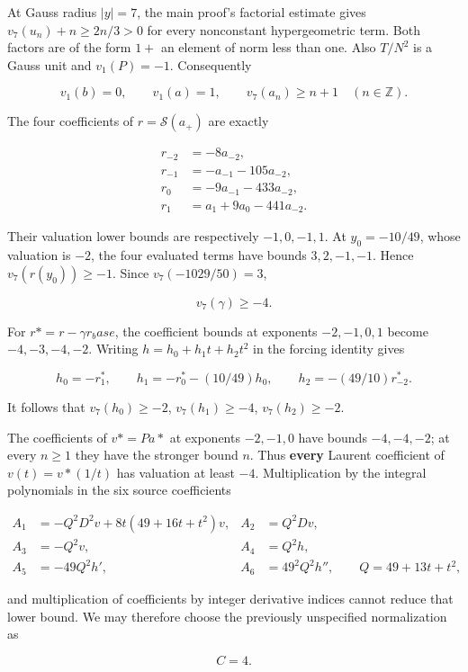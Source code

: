 \documentclass[11pt,a4paper]{article}
\begin{document}
At Gauss radius \(|y|=7\), the main proof's factorial estimate gives \(v_{7}(u_n)+n≥2n/3>0\) for every nonconstant hypergeometric term. Both factors are of the form \(1+\) an element of norm less than one. Also \(T/N^{2}\) is a Gauss unit and \(v_{1}(P)=-1\). Consequently

\[
v_1(b)=0,\qquad v_1(a)=1,\qquad v_7(a_n)\ge n+1\quad(n\in\mathbb Z).
\]

The four coefficients of \(r=\mathcal{S}(a_{+})\) are exactly

\[
\begin{aligned}
r_{-2}&=-8a_{-2},\\
r_{-1}&=-a_{-1}-105a_{-2},\\
r_0&=-9a_{-1}-433a_{-2},\\
r_1&=a_1+9a_0-441a_{-2}.
\end{aligned}
\]

Their valuation lower bounds are respectively \(-1,0,-1,1\). At \(y_{0}=-10/49\), whose valuation is \(-2\), the four evaluated terms have bounds \(3,2,-1,-1\). Hence \(v_{7}(r(y_{0}))≥-1\). Since \(v_{7}(-1029/50)=3\),

\[
v_7(\gamma)\ge-4.
\]

For \(r*=r-γr_base\), the coefficient bounds at exponents \(-2,-1,0,1\) become \(-4,-3,-4,-2\). Writing \(h=h_{0}+h_{1}t+h_{2}t^{2}\) in the forcing identity gives

\[
h_0=-r^*_1,\qquad
h_1=-r^*_0-(10/49)h_0,\qquad
h_2=-(49/10)r^*_{-2}.
\]

It follows that \(v_{7}(h_{0})≥-2\), \(v_{7}(h_{1})≥-4\), \(v_{7}(h_{2})≥-2\).

The coefficients of \(v*=Pa*\) at exponents \(-2,-1,0\) have bounds \(-4,-4,-2\); at every \(n≥1\) they have the stronger bound \(n\). Thus \textbf{every} Laurent coefficient of \(v(t)=v*(1/t)\) has valuation at least \(-4\). Multiplication by the integral polynomials in the six source coefficients

\[
\begin{aligned}
A_1&=-Q^2D^2v+8t(49+16t+t^2)v,&A_2&=Q^2Dv,\\
A_3&=-Q^2v,&A_4&=Q^2h,\\
A_5&=-49Q^2h',&A_6&=49^2Q^2h'',\qquad Q=49+13t+t^2,
\end{aligned}
\]

and multiplication of coefficients by integer derivative indices cannot reduce that lower bound. We may therefore choose the previously unspecified normalization as

\[
\boxed{C=4.}
\]
\end{document}
